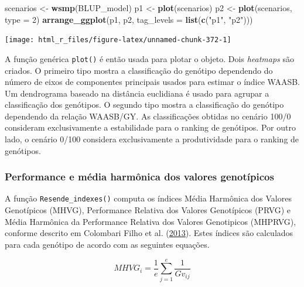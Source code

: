 \documentclass[
]{book}
\makeatletter
\newenvironment{Shaded}{\begin{snugshade}}{\end{snugshade}}
\newcommand{\DataTypeTok}[1]{\textcolor[rgb]{0.13,0.29,0.53}{#1}}
\newcommand{\DecValTok}[1]{\textcolor[rgb]{0.00,0.00,0.81}{#1}}
\newcommand{\KeywordTok}[1]{\textcolor[rgb]{0.13,0.29,0.53}{\textbf{#1}}}
\newcommand{\NormalTok}[1]{#1}
\newcommand{\StringTok}[1]{\textcolor[rgb]{0.31,0.60,0.02}{#1}}
\numberwithin{equation}{section}
\newcommand{\indf}[1]{\index[function]{#1@\texttt{#1()}|ST}}
\makeatother
\begin{document}
\begin{Shaded}
\begin{Highlighting}[]
\NormalTok{scenarios \textless{}{-}}\StringTok{ }\KeywordTok{wsmp}\NormalTok{(BLUP\_model)}
\NormalTok{p1 \textless{}{-}}\StringTok{ }\KeywordTok{plot}\NormalTok{(scenarios)}
\NormalTok{p2 \textless{}{-}}\StringTok{ }\KeywordTok{plot}\NormalTok{(scenarios, }\DataTypeTok{type =} \DecValTok{2}\NormalTok{)}
\KeywordTok{arrange\_ggplot}\NormalTok{(p1, p2, }\DataTypeTok{tag\_levels =} \KeywordTok{list}\NormalTok{(}\KeywordTok{c}\NormalTok{(}\StringTok{"p1"}\NormalTok{, }\StringTok{"p2"}\NormalTok{)))}
\end{Highlighting}
\end{Shaded}

\begin{center}\texttt{[image: html\_r\_files/figure-latex/unnamed-chunk-372-1]} \end{center}

A função genérica \texttt{plot()} \indf{plot} é então usada para plotar o objeto. Dois \emph{heatmaps} são criados. O primeiro tipo mostra a classificação do genótipo dependendo do número de eixos de componentes principais usados para estimar o índice WAASB. Um dendrograma baseado na distância euclidiana é usado para agrupar a classificação dos genótipos. O segundo tipo mostra a classificação do genótipo dependendo da relação WAASB/GY. As classificações obtidas no cenário 100/0 consideram exclusivamente a estabilidade para o ranking de genótipos. Por outro lado, o cenário 0/100 considera exclusivamente a produtividade para o ranking de genótipos.

\hypertarget{performance-e-muxe9dia-harmuxf4nica-dos-valores-genotuxedpicos}{%
\subsubsection{Performance e média harmônica dos valores genotípicos}\label{performance-e-muxe9dia-harmuxf4nica-dos-valores-genotuxedpicos}}

A função \texttt{Resende\_indexes()} computa os índices Média Harmônica dos Valores Genotípicos (MHVG), Performance Relativa dos Valores Genotípicos (PRVG) e Média Harmônica da Performance Relativa dos Valores Genotipicos (MHPRVG), conforme descrito em Colombari Filho et al. (\protect\hyperlink{ref-ColombariFilho2013}{2013}). Estes índices são calculados para cada genótipo de acordo com as seguintes equações.

\[
MHVG_i = \frac{1}{e}\sum\limits_{j = 1}^e {\frac{1}{{G{v_{ij}}}}}
\]
\end{document}
